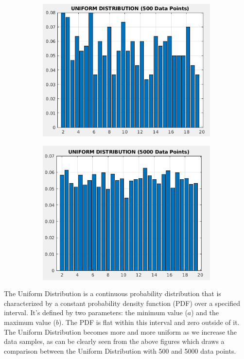\documentclass{article}
\theoremstyle{mytheoremstyle}
\theoremstyle{mytheoremstyle}
\theoremstyle{myproblemstyle}
\begin{document}
\begin{figure}[htbp]
    \begin{subfigure}[b]{0.5\textwidth}
        \includegraphics[width=\linewidth]{uniform_5.png}
    \end{subfigure}
    \begin{subfigure}[b]{0.5\textwidth}
        \includegraphics[width=\linewidth]{uniform_5k.png}    
    \end{subfigure}
\end{figure}

The Uniform Distribution is a continuous probability distribution that is characterized by a constant probability density function (PDF) over a specified interval. It's defined by two parameters: the minimum value ($a$) and the maximum value ($b$). The PDF is flat within this interval and zero outside of it. The Uniform Distribution becomes more and more uniform as we increase the data samples, as can be clearly seen from the above figures which draws a comparison between the Uniform Distribution with 500 and 5000 data points.
\end{document}
